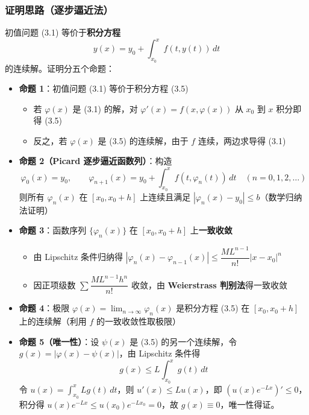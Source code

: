 \subsubsection{证明思路（逐步逼近法）}

初值问题 (3.1) 等价于\textbf{积分方程}
\begin{equation}y(x) = y_0 + \int_{x_0}^{x} f(t, y(t))\,dt \tag{3.5}\end{equation}
的连续解。证明分五个命题：

\begin{itemize}
    \item \textbf{命题 1}：初值问题 (3.1) 等价于积分方程 (3.5)
    \begin{itemize}
        \item 若 $\varphi(x)$ 是 (3.1) 的解，对 $\varphi'(x) = f(x, \varphi(x))$ 从 $x_0$ 到 $x$ 积分即得 (3.5)
        \item 反之，若 $\varphi(x)$ 是 (3.5) 的连续解，由于 $f$ 连续，两边求导得 (3.1)
    \end{itemize}
    \item \textbf{命题 2（Picard 逐步逼近函数列）}：构造
    \begin{equation}\varphi_0(x) = y_0, \qquad \varphi_{n+1}(x) = y_0 + \int_{x_0}^{x} f(t, \varphi_n(t))\,dt \quad (n = 0, 1, 2, \ldots) \tag{3.7}\end{equation}
    则所有 $\varphi_n(x)$ 在 $[x_0, x_0 + h]$ 上连续且满足 $|\varphi_n(x) - y_0| \le b$（数学归纳法证明）
    \item \textbf{命题 3}：函数序列 $\{\varphi_n(x)\}$ 在 $[x_0, x_0+h]$ 上\textbf{一致收敛}
    \begin{itemize}
        \item 由 Lipschitz 条件归纳得 $|\varphi_n(x) - \varphi_{n-1}(x)| \le \dfrac{ML^{n-1}}{n!}|x - x_0|^n$
        \item 因正项级数 $\sum \dfrac{ML^{n-1}h^n}{n!}$ 收敛，由 \textbf{Weierstrass 判别法}得一致收敛
    \end{itemize}
    \item \textbf{命题 4}：极限 $\varphi(x) = \lim_{n\to\infty}\varphi_n(x)$ 是积分方程 (3.5) 在 $[x_0, x_0+h]$ 上的连续解（利用 $f$ 的一致收敛性取极限）
    \item \textbf{命题 5（唯一性）}：设 $\psi(x)$ 是 (3.5) 的另一个连续解，令 $g(x) = |\varphi(x) - \psi(x)|$，由 Lipschitz 条件得
    $$g(x) \le L\int_{x_0}^{x} g(t)\,dt$$
    令 $u(x) = \int_{x_0}^{x} L g(t)\,dt$，则 $u'(x) \le Lu(x)$，即 $(u(x)e^{-Lx})' \le 0$，积分得 $u(x)e^{-Lx} \le u(x_0)e^{-Lx_0} = 0$，故 $g(x) \equiv 0$，唯一性得证。
\end{itemize}

